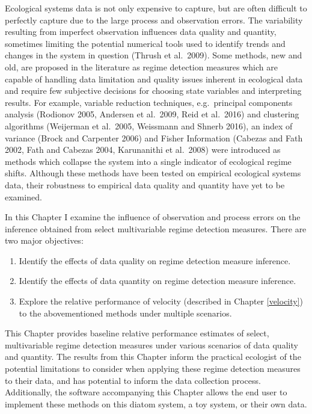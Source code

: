 \documentclass[12pt,twoside,openany]{reedthesis}
\begin{document}
Ecological systems data is not only expensive to capture, but are often difficult to perfectly capture due to the large process and observation errors. The variability resulting from imperfect observation influences data quality and quantity, sometimes limiting the potential numerical tools used to identify trends and changes in the system in question (Thrush et al.~2009). Some methods, new and old, are proposed in the literature as regime detection measures which are capable of handling data limitation and quality issues inherent in ecological data and require few subjective decisions for choosing state variables and interpreting results. For example, variable reduction techniques, e.g.~principal components analysis (Rodionov 2005, Andersen et al.~2009, Reid et al.~2016) and clustering algorithms (Weijerman et al.~2005, Weissmann and Shnerb 2016), an index of variance (Brock and Carpenter 2006) and Fisher Information (Cabezas and Fath 2002, Fath and Cabezas 2004, Karunanithi et al.~2008) were introduced as methods which collapse the system into a single indicator of ecological regime shifts. Although these methods have been tested on empirical ecological systems data, their robustness to empirical data quality and quantity have yet to be examined.

In this Chapter I examine the influence of observation and process errors on the inference obtained from select multivariable regime detection measures. There are two major objectives:
\begin{enumerate}
\def\labelenumi{\arabic{enumi}.}
\item
  Identify the effects of data quality on regime detection measure inference.
\item
  Identify the effects of data quantity on regime detection measure inference.
\item
  Explore the relative performance of velocity (described in Chapter \ref{velocity}) to the abovementioned methods under multiple scenarios.
\end{enumerate}
This Chapter provides baseline relative performance estimates of select, multivariable regime detection measures under various scenarios of data quality and quantity. The results from this Chapter inform the practical ecologist of the potential limitations to consider when applying these regime detection measures to their data, and has potential to inform the data collection process. Additionally, the software accompanying this Chapter allows the end user to implement these methods on this diatom system, a toy system, or their own data.
\end{document}
